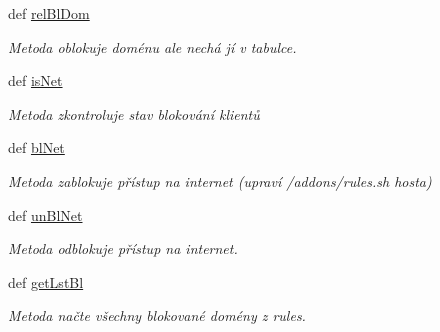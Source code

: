 \begin{DoxyCompactItemize}
def \hyperlink{classfwSetUp_1_1fwSetUp_ab96ab2edba8c87302754c40491ca0d17}{rel\-Bl\-Dom}
\begin{DoxyCompactList}\small\item\em Metoda oblokuje doménu ale nechá jí v tabulce. \end{DoxyCompactList}\item 
def \hyperlink{classfwSetUp_1_1fwSetUp_a75a8c09d8493ac43747cb4c518bef7dd}{is\-Net}
\begin{DoxyCompactList}\small\item\em Metoda zkontroluje stav blokování klientů \end{DoxyCompactList}\item 
def \hyperlink{classfwSetUp_1_1fwSetUp_a4d21f86d17c54919fbdc2e3f069fa471}{bl\-Net}
\begin{DoxyCompactList}\small\item\em Metoda zablokuje přístup na internet (upraví /addons/rules.sh hosta) \end{DoxyCompactList}\item 
def \hyperlink{classfwSetUp_1_1fwSetUp_a4f770f10b81c0030b1753dfb60452045}{un\-Bl\-Net}
\begin{DoxyCompactList}\small\item\em Metoda odblokuje přístup na internet. \end{DoxyCompactList}\item 
def \hyperlink{classfwSetUp_1_1fwSetUp_a9d56382f2c43c78f6dcf2057580a5ed2}{get\-Lst\-Bl}
\begin{DoxyCompactList}\small\item\em Metoda načte všechny blokované domény z rules. \end{DoxyCompactList}\end{DoxyCompactItemize}
